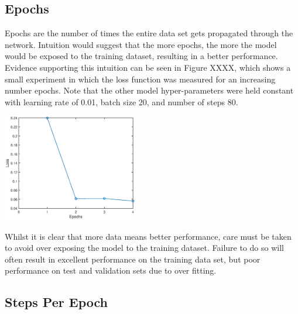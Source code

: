 \documentclass[a4paper]{article}
\begin{document}
\subsection{Epochs}
\begin{minipage}{0.45\textwidth}
Epochs are the number of times the entire data set gets propagated through the network. Intuition would suggest that the more epochs, the more the model would be exposed to the training dataset, resulting in a better performance. Evidence supporting this intuition can be seen in Figure XXXX, which shows a small experiment in which the loss function was measured for an increasing number epochs. Note that the other model hyper-parameters were held constant with learning rate of 0.01, batch size 20, and number of steps 80.
\end{minipage}
\hspace{1cm}
\begin{minipage}{0.45\textwidth}
\centering
\includegraphics[height=4.7cm]{hyp_par_2}
\end{minipage}

\vspace{0.2cm}

Whilst it is clear that more data means better performance, care must be taken to avoid over exposing the model to the training dataset. Failure to do so will often result in excellent performance on the training data set, but poor performance on test and validation sets due to over fitting.

\subsection{Steps Per Epoch}
\end{document}
